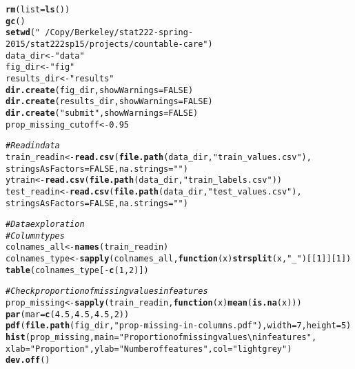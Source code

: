 \documentclass{article}\usepackage[]{graphicx}\usepackage[]{color}
\makeatletter
\newcommand{\hlnum}[1]{\textcolor[rgb]{0.686,0.059,0.569}{#1}}%
\newcommand{\hlstr}[1]{\textcolor[rgb]{0.192,0.494,0.8}{#1}}%
\newcommand{\hlcom}[1]{\textcolor[rgb]{0.678,0.584,0.686}{\textit{#1}}}%
\newcommand{\hlopt}[1]{\textcolor[rgb]{0,0,0}{#1}}%
\newcommand{\hlstd}[1]{\textcolor[rgb]{0.345,0.345,0.345}{#1}}%
\newcommand{\hlkwa}[1]{\textcolor[rgb]{0.161,0.373,0.58}{\textbf{#1}}}%
\newcommand{\hlkwb}[1]{\textcolor[rgb]{0.69,0.353,0.396}{#1}}%
\newcommand{\hlkwc}[1]{\textcolor[rgb]{0.333,0.667,0.333}{#1}}%
\newcommand{\hlkwd}[1]{\textcolor[rgb]{0.737,0.353,0.396}{\textbf{#1}}}%
\newenvironment{kframe}{%
 \def\at@end@of@kframe{}%
 \ifinner\ifhmode%
  \def\at@end@of@kframe{\end{minipage}}%
  \begin{minipage}{\columnwidth}%
 \fi\fi%
 \def\FrameCommand##1{\hskip\@totalleftmargin \hskip-\fboxsep
 \colorbox{shadecolor}{##1}\hskip-\fboxsep
     \hskip-\linewidth \hskip-\@totalleftmargin \hskip\columnwidth}%
 \MakeFramed {\advance\hsize-\width
   \@totalleftmargin\z@ \linewidth\hsize
   \@setminipage}}%
 {\par\unskip\endMakeFramed%
 \at@end@of@kframe}
\newenvironment{knitrout}{}{} %
\makeatother
\begin{document}
\begin{knitrout}
\color{fgcolor}\begin{kframe}
\begin{alltt}
\hlkwd{rm}\hlstd{(}\hlkwc{list} \hlstd{=} \hlkwd{ls}\hlstd{())}
\hlkwd{gc}\hlstd{()}
\hlkwd{setwd}\hlstd{(}\hlstr{"~/Copy/Berkeley/stat222-spring-2015/stat222sp15/projects/countable-care"}\hlstd{)}
\hlstd{data_dir} \hlkwb{<-} \hlstr{"data"}
\hlstd{fig_dir} \hlkwb{<-} \hlstr{"fig"}
\hlstd{results_dir} \hlkwb{<-} \hlstr{"results"}
\hlkwd{dir.create}\hlstd{(fig_dir,} \hlkwc{showWarnings} \hlstd{=} \hlnum{FALSE}\hlstd{)}
\hlkwd{dir.create}\hlstd{(results_dir,} \hlkwc{showWarnings} \hlstd{=} \hlnum{FALSE}\hlstd{)}
\hlkwd{dir.create}\hlstd{(}\hlstr{"submit"}\hlstd{,} \hlkwc{showWarnings} \hlstd{=} \hlnum{FALSE}\hlstd{)}
\hlstd{prop_missing_cutoff} \hlkwb{<-} \hlnum{0.95}

\hlcom{# Read in data}
\hlstd{train_readin} \hlkwb{<-} \hlkwd{read.csv}\hlstd{(}\hlkwd{file.path}\hlstd{(data_dir,} \hlstr{"train_values.csv"}\hlstd{),}
                         \hlkwc{stringsAsFactors} \hlstd{=} \hlnum{FALSE}\hlstd{,} \hlkwc{na.strings} \hlstd{=} \hlstr{""}\hlstd{)}
\hlstd{ytrain} \hlkwb{<-} \hlkwd{read.csv}\hlstd{(}\hlkwd{file.path}\hlstd{(data_dir,} \hlstr{"train_labels.csv"}\hlstd{))}
\hlstd{test_readin} \hlkwb{<-} \hlkwd{read.csv}\hlstd{(}\hlkwd{file.path}\hlstd{(data_dir,} \hlstr{"test_values.csv"}\hlstd{),}
                        \hlkwc{stringsAsFactors} \hlstd{=} \hlnum{FALSE}\hlstd{,} \hlkwc{na.strings} \hlstd{=} \hlstr{""}\hlstd{)}

\hlcom{# Data exploration}
\hlcom{# Column types}
\hlstd{colnames_all} \hlkwb{<-} \hlkwd{names}\hlstd{(train_readin)}
\hlstd{colnames_type} \hlkwb{<-} \hlkwd{sapply}\hlstd{(colnames_all,} \hlkwa{function}\hlstd{(}\hlkwc{x}\hlstd{)} \hlkwd{strsplit}\hlstd{(x,} \hlstr{"_"}\hlstd{)[[}\hlnum{1}\hlstd{]][}\hlnum{1}\hlstd{])}
\hlkwd{table}\hlstd{(colnames_type[}\hlopt{-}\hlkwd{c}\hlstd{(}\hlnum{1}\hlstd{,} \hlnum{2}\hlstd{)])}

\hlcom{# Check proportion of missing values in features}
\hlstd{prop_missing} \hlkwb{<-} \hlkwd{sapply}\hlstd{(train_readin,} \hlkwa{function}\hlstd{(}\hlkwc{x}\hlstd{)} \hlkwd{mean}\hlstd{(}\hlkwd{is.na}\hlstd{(x)))}
\hlkwd{par}\hlstd{(}\hlkwc{mar} \hlstd{=} \hlkwd{c}\hlstd{(}\hlnum{4.5}\hlstd{,} \hlnum{4.5}\hlstd{,} \hlnum{4.5}\hlstd{,} \hlnum{2}\hlstd{))}
\hlkwd{pdf}\hlstd{(}\hlkwd{file.path}\hlstd{(fig_dir,} \hlstr{"prop-missing-in-columns.pdf"}\hlstd{),} \hlkwc{width} \hlstd{=} \hlnum{7}\hlstd{,} \hlkwc{height} \hlstd{=} \hlnum{5}\hlstd{)}
\hlkwd{hist}\hlstd{(prop_missing,} \hlkwc{main} \hlstd{=} \hlstr{"Proportion of missing values\textbackslash{}nin features"}\hlstd{,}
     \hlkwc{xlab} \hlstd{=} \hlstr{"Proportion"}\hlstd{,} \hlkwc{ylab} \hlstd{=} \hlstr{"Number of features"}\hlstd{,} \hlkwc{col} \hlstd{=} \hlstr{"lightgrey"}\hlstd{)}
\hlkwd{dev.off}\hlstd{()}


\end{alltt}
\end{kframe}
\end{knitrout}
\end{document}
